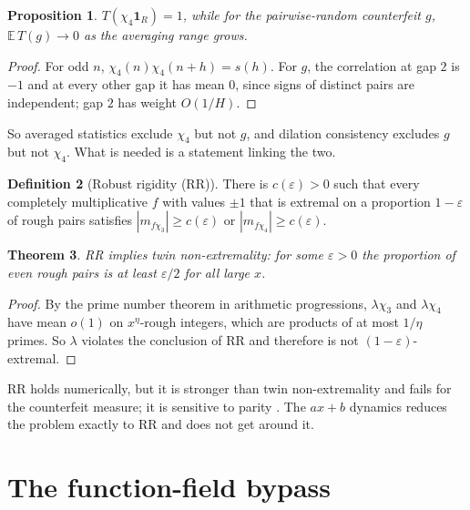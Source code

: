 \documentclass[11pt]{amsart}
\newtheorem{theorem}{Theorem}[section]
\newtheorem{proposition}[theorem]{Proposition}
\theoremstyle{definition}
\newtheorem{definition}[theorem]{Definition}
\theoremstyle{remark}
\newcommand{\one}{\mathbf 1}
\begin{document}
\begin{proposition}\label{prop:avg}
$T(\chi_4\one_R)=1$, while for the pairwise-random counterfeit $g$, $\mathbb E\,T(g)\to0$ as the averaging range grows.
\end{proposition}

\begin{proof}
For odd $n$, $\chi_4(n)\chi_4(n+h)=s(h)$. For $g$, the correlation at gap $2$ is $-1$ and at every other gap it has mean $0$, since signs of distinct pairs are independent; gap $2$ has weight $O(1/H)$.
\end{proof}

So averaged statistics exclude $\chi_4$ but not $g$, and dilation consistency excludes $g$ but not $\chi_4$. What is needed is a statement linking the two.

\begin{definition}[Robust rigidity (RR)]
There is $c(\varepsilon)>0$ such that every completely multiplicative $f$ with values $\pm1$ that is extremal on a proportion $1-\varepsilon$ of rough pairs satisfies $|m_{f\chi_3}|\ge c(\varepsilon)$ or $|m_{f\chi_4}|\ge c(\varepsilon)$.
\end{definition}

\begin{theorem}\label{thm:RR}
RR implies twin non-extremality: for some $\varepsilon>0$ the proportion of even rough pairs is at least $\varepsilon/2$ for all large $x$.
\end{theorem}

\begin{proof}
By the prime number theorem in arithmetic progressions, $\lambda\chi_3$ and $\lambda\chi_4$ have mean $o(1)$ on $x^\eta$-rough integers, which are products of at most $1/\eta$ primes. So $\lambda$ violates the conclusion of RR and therefore is not $(1-\varepsilon)$-extremal.
\end{proof}

RR holds numerically, but it is stronger than twin non-extremality and fails for the counterfeit measure; it is sensitive to parity \cite{Wan26c}. The $ax+b$ dynamics reduces the problem exactly to RR and does not get around it.

\section{The function-field bypass}\label{sec:ff}
\end{document}
